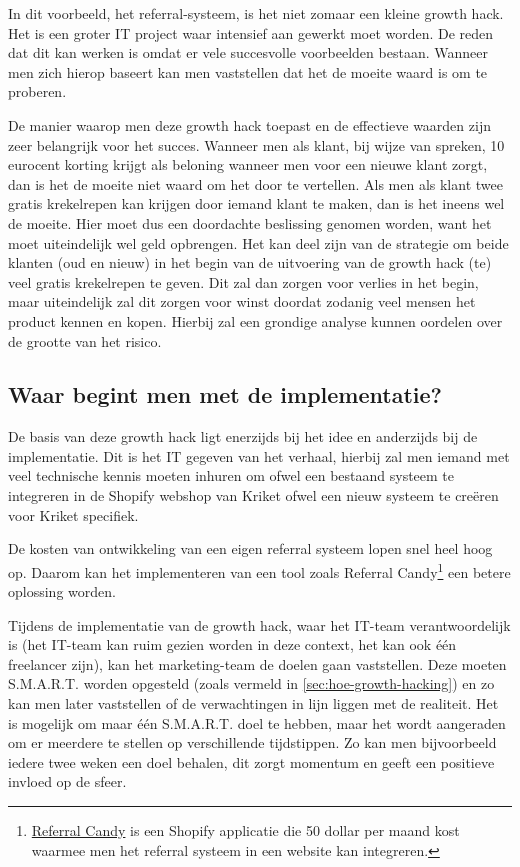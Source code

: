 In dit voorbeeld, het referral-systeem, is het niet zomaar een kleine growth hack. Het is een groter IT project waar intensief aan gewerkt moet worden. De reden dat dit kan werken is omdat er vele succesvolle voorbeelden bestaan. Wanneer men zich hierop baseert kan men vaststellen dat het de moeite waard is om te proberen.

De manier waarop men deze growth hack toepast en de effectieve waarden zijn zeer belangrijk voor het succes. Wanneer men als klant, bij wijze van spreken, 10 eurocent korting krijgt als beloning wanneer men voor een nieuwe klant zorgt, dan is het de moeite niet waard om het door te vertellen. Als men als klant twee gratis krekelrepen kan krijgen door iemand klant te maken, dan is het ineens wel de moeite. Hier moet dus een doordachte beslissing genomen worden, want het moet uiteindelijk wel geld opbrengen. Het kan deel zijn van de strategie om beide klanten (oud en nieuw) in het begin van de uitvoering van de growth hack (te) veel gratis krekelrepen te geven. Dit zal dan zorgen voor verlies in het begin, maar uiteindelijk zal dit zorgen voor winst doordat zodanig veel mensen het product kennen en kopen. Hierbij zal een grondige analyse kunnen oordelen over de grootte van het risico.

\subsection{Waar begint men met de implementatie?}
\label{subsec:begin-implementatie}
De basis van deze growth hack ligt enerzijds bij het idee en anderzijds bij de implementatie. Dit is het IT gegeven van het verhaal, hierbij zal men iemand met veel technische kennis moeten inhuren om ofwel een bestaand systeem te integreren in de Shopify webshop van Kriket ofwel een nieuw systeem te creëren voor Kriket specifiek.

De kosten van ontwikkeling van een eigen referral systeem lopen snel heel hoog op. Daarom kan het implementeren van een tool zoals Referral Candy\footnote{\href{https://apps.shopify.com/referralcandy}{Referral Candy} is een Shopify applicatie die 50 dollar per maand kost waarmee men het referral systeem in een website kan integreren.} een betere oplossing worden. 

Tijdens de implementatie van de growth hack, waar het IT-team verantwoordelijk is (het IT-team kan ruim gezien worden in deze context, het kan ook één freelancer zijn), kan het marketing-team de doelen gaan vaststellen. Deze moeten S.M.A.R.T. worden opgesteld (zoals vermeld in \ref{sec:hoe-growth-hacking}) en zo kan men later vaststellen of de verwachtingen in lijn liggen met de realiteit. Het is mogelijk om maar één S.M.A.R.T. doel te hebben, maar het wordt aangeraden om er meerdere te stellen op verschillende tijdstippen. Zo kan men bijvoorbeeld iedere twee weken een doel behalen, dit zorgt momentum en geeft een positieve invloed op de sfeer.

